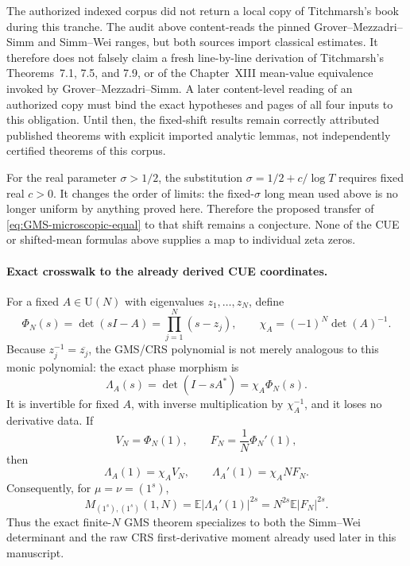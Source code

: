 \begin{obligation}
\label{obl:GMS-audit-Titchmarsh-boundary}
The authorized indexed corpus did not return a local copy of Titchmarsh's book during this
tranche.  The audit above content-reads the pinned Grover--Mezzadri--Simm and Simm--Wei ranges,
but both sources import classical estimates.  It therefore does not falsely claim a fresh
line-by-line derivation of Titchmarsh's Theorems~7.1, 7.5, and 7.9, or of the Chapter~XIII
mean-value equivalence invoked by Grover--Mezzadri--Simm.  A later content-level reading of an
authorized copy must bind the exact hypotheses and pages of all four inputs to this
obligation.  Until then, the fixed-shift results remain correctly attributed published
theorems with explicit imported analytic lemmas, not independently certified theorems of this
corpus.
\end{obligation}

For the real parameter $\sigma>1/2$, the substitution
$\sigma=1/2+c/\log T$ requires fixed real $c>0$.  It changes the order of limits: the fixed-$\sigma$ long
mean used above is no longer uniform by anything proved here.  Therefore the proposed transfer
of \eqref{eq:GMS-microscopic-equal} to that shift remains a conjecture.  None of the CUE or
shifted-mean formulas above supplies a map to individual zeta zeros.

\paragraph{Exact crosswalk to the already derived CUE coordinates.}
For a fixed $A\in\mathrm U(N)$ with eigenvalues $z_1,\ldots,z_N$, define
\begin{equation}
 \Phi_N(s)=\det(sI-A)=\prod_{j=1}^{N}(s-z_j),
 \qquad
 \chi_A=(-1)^N\det(A)^{-1}.
 \label{eq:GMS-audit-Phi-chi}
\end{equation}
Because $z_j^{-1}=\overline{z_j}$, the GMS/CRS polynomial is not merely analogous to this
monic polynomial: the exact phase morphism is
\begin{equation}
 \Lambda_A(s)=\det(I-sA^*)=\chi_A\Phi_N(s).
 \label{eq:GMS-audit-exact-phase-morphism}
\end{equation}
It is invertible for fixed $A$, with inverse multiplication by $\chi_A^{-1}$, and it loses no
derivative data.  If
\begin{equation}
 V_N=\Phi_N(1),
 \qquad F_N=\frac1N\Phi_N'(1),
 \label{eq:GMS-audit-VF}
\end{equation}
then
\begin{equation}
 \Lambda_A(1)=\chi_AV_N,
 \qquad
 \Lambda_A'(1)=\chi_ANF_N.
 \label{eq:GMS-audit-first-jet-phase}
\end{equation}
Consequently, for $\mu=\nu=(1^s)$,
\begin{equation}
 M_{(1^s),(1^s)}(1,N)
 =\mathbb E|\Lambda_A'(1)|^{2s}
 =N^{2s}\mathbb E|F_N|^{2s}.
 \label{eq:GMS-audit-exact-raw-moment-map}
\end{equation}
Thus the exact finite-$N$ GMS theorem specializes to both the Simm--Wei determinant and the
raw CRS first-derivative moment already used later in this manuscript.

